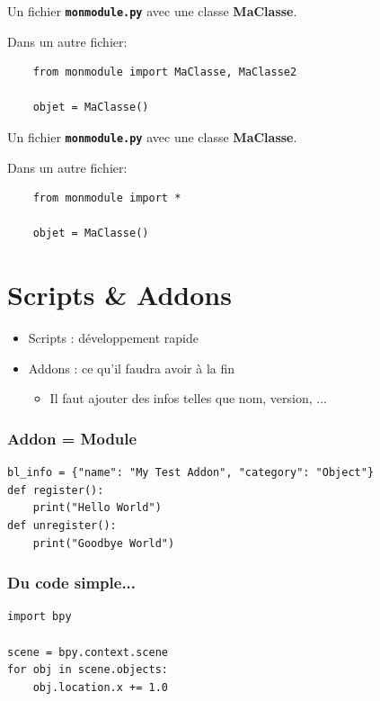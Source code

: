 \documentclass[11pt,usenames,dvipsnames]{beamer}
\begin{document}
\begin{frame}[fragile]
Un fichier \textbf{\texttt{monmodule.py}} avec une classe \textbf{MaClasse}.

Dans un autre fichier:
  \begin{lstlisting}
    from monmodule import MaClasse, MaClasse2
    
    objet = MaClasse()
  \end{lstlisting}
\end{frame}


\begin{frame}[fragile]
Un fichier \textbf{\texttt{monmodule.py}} avec une classe \textbf{MaClasse}.

Dans un autre fichier:
  \begin{lstlisting}
    from monmodule import *
    
    objet = MaClasse()
  \end{lstlisting}
\end{frame}

\section{Scripts \& Addons}
\begin{frame}
  \begin{itemize}
    \item Scripts : développement rapide
    \item Addons : ce qu'il faudra avoir à la fin
      \begin{itemize}
      \item Il faut ajouter des infos telles que nom, version, ...
      \end{itemize}

  \end{itemize}
\end{frame}


\begin{frame}[fragile]
  \frametitle{Addon = Module}
  \begin{lstlisting}
bl_info = {"name": "My Test Addon", "category": "Object"}
def register():
    print("Hello World")
def unregister():
    print("Goodbye World")
  \end{lstlisting}
\end{frame}

\begin{frame}[fragile]
  \frametitle{Du code simple...}
  \begin{lstlisting}
import bpy

scene = bpy.context.scene
for obj in scene.objects:
    obj.location.x += 1.0
  \end{lstlisting}
\end{frame}
\end{document}
